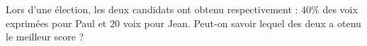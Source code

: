 
\begin{exercice}\label{exosmath-0796}

 Lors d'une élection, les deux candidats ont obtenu respectivement : $40\%$ des voix exprimées pour Paul et $20$ voix pour Jean. Peut-on savoir lequel des deux a otenu le meilleur score ?

\end{exercice}
